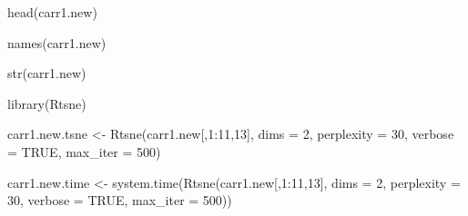 \documentclass[
]{article}
\newenvironment{Shaded}{\begin{snugshade}}{\end{snugshade}}
\newcommand{\AttributeTok}[1]{\textcolor[rgb]{0.77,0.63,0.00}{#1}}
\newcommand{\ConstantTok}[1]{\textcolor[rgb]{0.00,0.00,0.00}{#1}}
\newcommand{\DecValTok}[1]{\textcolor[rgb]{0.00,0.00,0.81}{#1}}
\newcommand{\FunctionTok}[1]{\textcolor[rgb]{0.00,0.00,0.00}{#1}}
\newcommand{\NormalTok}[1]{#1}
\newcommand{\OtherTok}[1]{\textcolor[rgb]{0.56,0.35,0.01}{#1}}
\newcommand{\SpecialCharTok}[1]{\textcolor[rgb]{0.00,0.00,0.00}{#1}}
\begin{document}
\begin{Shaded}
\begin{Highlighting}[]
\FunctionTok{head}\NormalTok{(carr1.new)}
\end{Highlighting}
\end{Shaded}

\begin{Shaded}
\begin{Highlighting}[]
\FunctionTok{names}\NormalTok{(carr1.new)}
\end{Highlighting}
\end{Shaded}

\begin{Shaded}
\begin{Highlighting}[]
\FunctionTok{str}\NormalTok{(carr1.new)}
\end{Highlighting}
\end{Shaded}

\begin{Shaded}
\begin{Highlighting}[]
\FunctionTok{library}\NormalTok{(Rtsne)}
\end{Highlighting}
\end{Shaded}

\begin{Shaded}
\end{Shaded}

\begin{Shaded}
\begin{Highlighting}[]
\NormalTok{carr1.new.tsne }\OtherTok{\textless{}{-}} \FunctionTok{Rtsne}\NormalTok{(carr1.new[,}\DecValTok{1}\SpecialCharTok{:}\DecValTok{11}\NormalTok{,}\DecValTok{13}\NormalTok{], }\AttributeTok{dims =} \DecValTok{2}\NormalTok{, }\AttributeTok{perplexity =} \DecValTok{30}\NormalTok{, }\AttributeTok{verbose =} \ConstantTok{TRUE}\NormalTok{, }\AttributeTok{max\_iter =} \DecValTok{500}\NormalTok{)}

\NormalTok{carr1.new.time }\OtherTok{\textless{}{-}} \FunctionTok{system.time}\NormalTok{(}\FunctionTok{Rtsne}\NormalTok{(carr1.new[,}\DecValTok{1}\SpecialCharTok{:}\DecValTok{11}\NormalTok{,}\DecValTok{13}\NormalTok{], }\AttributeTok{dims =} \DecValTok{2}\NormalTok{, }\AttributeTok{perplexity =} \DecValTok{30}\NormalTok{, }\AttributeTok{verbose =} \ConstantTok{TRUE}\NormalTok{, }\AttributeTok{max\_iter =} \DecValTok{500}\NormalTok{))}
\end{Highlighting}
\end{Shaded}
\end{document}
